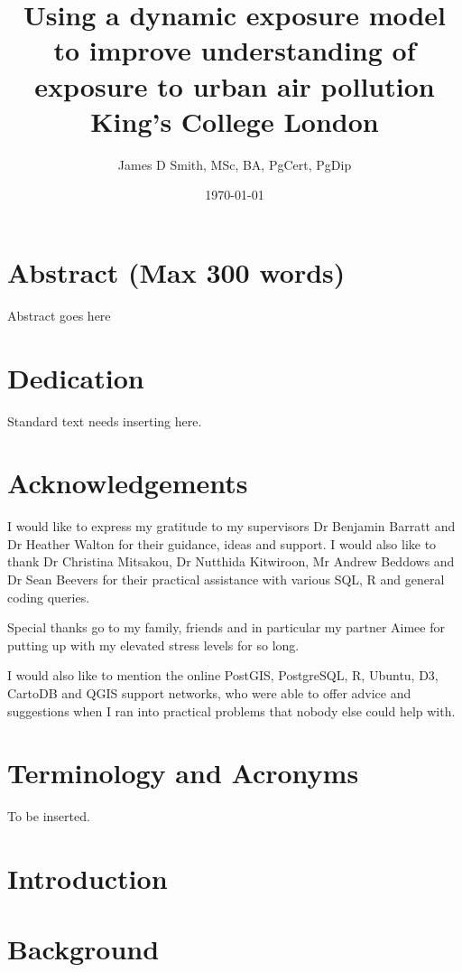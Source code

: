 \documentclass[12pt]{report}
\title{
	{Using a dynamic exposure model to improve understanding of exposure to urban air pollution}\\
	{\large King's College London}\\
}
\author{James D Smith, MSc, BA, PgCert, PgDip}
\date{\today}
\begin{document}
\maketitle

\chapter*{Abstract (Max 300 words)}
Abstract goes here

\chapter*{Dedication}
Standard text needs inserting here.

\chapter*{Acknowledgements}
I would like to express my gratitude to my supervisors Dr Benjamin Barratt and Dr Heather Walton for their guidance, ideas and support. I would also like to thank Dr Christina Mitsakou, Dr Nutthida Kitwiroon, Mr Andrew Beddows and Dr Sean Beevers for their practical assistance with various SQL, R and general coding queries.

Special thanks go to my family, friends and in particular my partner Aimee for putting up with my elevated stress levels for so long.

I would also like to mention the online PostGIS, PostgreSQL, R, Ubuntu, D3, CartoDB and QGIS support networks, who were able to offer advice and suggestions when I ran into practical problems that nobody else could help with. 

\chapter*{Terminology and Acronyms}
To be inserted.

\tableofcontents
\listoffigures

\chapter{Introduction}

\label{chap:intro}

\chapter{Background}

\label{chap:background}

\label{chap:dynamic_exposure}
\end{document}
